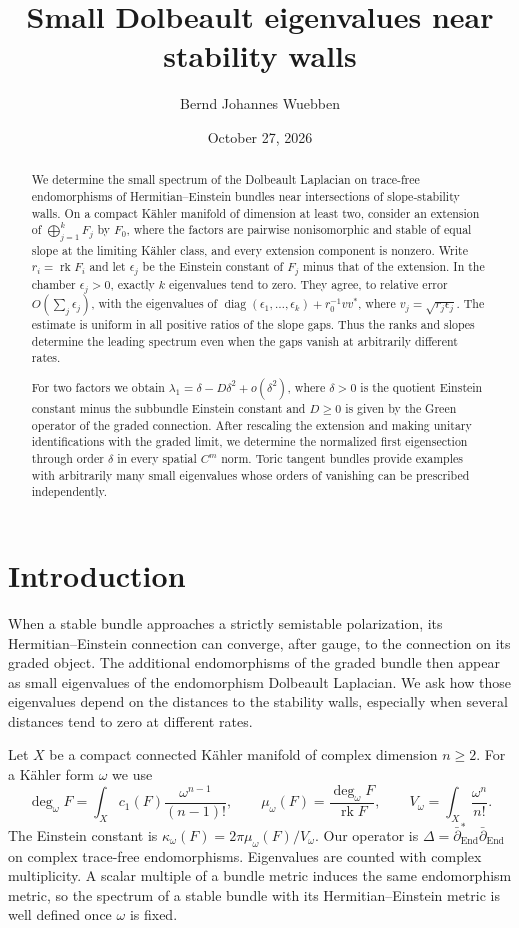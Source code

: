 \documentclass[11pt]{amsart}
\title{Small Dolbeault eigenvalues near stability walls}
\author{Bernd Johannes Wuebben}
\date{October 27, 2026}
\theoremstyle{remark}
\newcommand{\End}{\operatorname{End}}
\newcommand{\rk}{\operatorname{rk}}
\newcommand{\diag}{\operatorname{diag}}
\newcommand{\db}{\bar\partial}
\begin{document}
\begin{abstract}
We determine the small spectrum of the Dolbeault Laplacian on trace-free
endomorphisms of Hermitian--Einstein bundles near intersections of
slope-stability walls. On a compact K\"ahler manifold of dimension at
least two, consider an extension of $\bigoplus_{j=1}^kF_j$ by $F_0$,
where the factors are pairwise nonisomorphic and stable of equal slope
at the limiting K\"ahler class, and every extension component is nonzero.
Write $r_i=\rk F_i$ and let $\epsilon_j$ be the Einstein constant of
$F_j$ minus that of the extension. In the chamber $\epsilon_j>0$,
exactly $k$ eigenvalues tend to zero. They agree, to relative error
$O(\sum_j\epsilon_j)$, with the eigenvalues of
$\diag(\epsilon_1,\ldots,\epsilon_k)+r_0^{-1}vv^*$,
where $v_j=\sqrt{r_j\epsilon_j}$.
The estimate is uniform in all positive ratios of the slope gaps.
Thus the ranks and slopes determine the leading spectrum even when
the gaps vanish at arbitrarily different rates.

For two factors we obtain
$\lambda_1=\delta-D\delta^2+o(\delta^2)$, where $\delta>0$ is the
quotient Einstein constant minus the subbundle Einstein constant and
$D\ge0$ is given by the Green operator of the graded connection.
After rescaling the extension and making unitary identifications with
the graded limit, we determine the normalized first eigensection through
order $\delta$ in every spatial $C^m$ norm. Toric tangent bundles provide
examples with arbitrarily many small eigenvalues whose orders of
vanishing can be prescribed independently.
\end{abstract}
\maketitle

\section{Introduction}

When a stable bundle approaches a strictly semistable polarization,
its Hermitian--Einstein connection can converge, after gauge, to the
connection on its graded object. The additional endomorphisms of the
graded bundle then appear as small eigenvalues of the endomorphism
Dolbeault Laplacian. We ask how those eigenvalues depend on the distances
to the stability walls, especially when several distances tend to zero
at different rates.

Let $X$ be a compact connected K\"ahler manifold of complex dimension
$n\ge2$. For a K\"ahler form $\omega$ we use
\[
 \deg_\omega F=\int_Xc_1(F)\frac{\omega^{n-1}}{(n-1)!},\qquad
 \mu_\omega(F)=\frac{\deg_\omega F}{\rk F},\qquad
 V_\omega=\int_X\frac{\omega^n}{n!}.
\]
The Einstein constant is $\kappa_\omega(F)=2\pi\mu_\omega(F)/V_\omega$.
Our operator is $\Delta=\db_{\End}^*\db_{\End}$ on complex
trace-free endomorphisms. Eigenvalues are counted with complex
multiplicity. A scalar multiple of a bundle metric induces the same
endomorphism metric, so the spectrum of a stable bundle with its
Hermitian--Einstein metric is well defined once $\omega$ is fixed.
\end{document}
